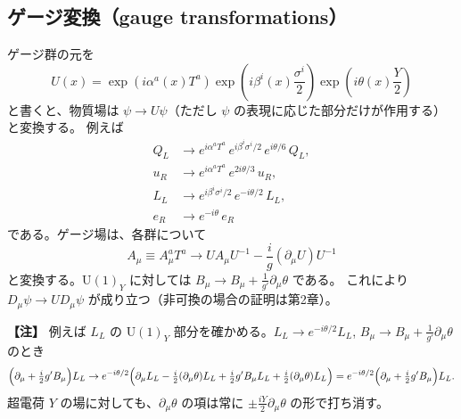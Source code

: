 \documentclass[uplatex,dvipdfmx,a4paper,11pt,openany]{jsbook}
\newenvironment{note}{\vspace{1ex}\par\footnotesize\noindent\textbf{【注】}}{\par\vspace{1ex}}
\numberwithin{equation}{chapter}
\theoremstyle{definition}
\theoremstyle{plain}
\theoremstyle{remark}
\newcommand{\U}{\mathrm{U}}
\begin{document}
\subsection{ゲージ変換（gauge transformations）}
ゲージ群の元を
\begin{equation}
U(x)=
\exp\left(i\alpha^a(x)T^a\right)
\exp\left(i\beta^i(x)\frac{\sigma^i}{2}\right)
\exp\left(i\theta(x)\frac{Y}{2}\right)
\end{equation}
と書くと、物質場は $\psi\to U\psi$（ただし $\psi$ の表現に応じた部分だけが作用する）と変換する。
例えば
\begin{align}
Q_L&\to
e^{i\alpha^aT^a}\,e^{i\beta^i\sigma^i/2}\,e^{i\theta/6}\,Q_L,\\
u_R&\to e^{i\alpha^aT^a}\,e^{2i\theta/3}\,u_R,\\
L_L&\to e^{i\beta^i\sigma^i/2}\,e^{-i\theta/2}\,L_L,\\
e_R&\to e^{-i\theta}\,e_R
\end{align}
である。ゲージ場は、各群について
\begin{equation}
A_\mu\equiv A_\mu^aT^a\to
UA_\mu U^{-1}-\frac ig(\partial_\mu U)U^{-1}
\end{equation}
と変換する。$\U(1)_Y$ に対しては
$B_\mu\to B_\mu+\frac{1}{g'}\partial_\mu\theta$ である。
これにより $D_\mu\psi\to UD_\mu\psi$ が成り立つ（非可換の場合の証明は第2章）。
\begin{note}
例えば $L_L$ の $\U(1)_Y$ 部分を確かめる。$L_L\to e^{-i\theta/2}L_L$,
$B_\mu\to B_\mu+\frac{1}{g'}\partial_\mu\theta$ のとき
\[
\Bigl(\partial_\mu+\tfrac i2g'B_\mu\Bigr)L_L
\to
e^{-i\theta/2}\Bigl(
\partial_\mu L_L-\tfrac i2(\partial_\mu\theta)L_L
+\tfrac i2g'B_\mu L_L+\tfrac i2(\partial_\mu\theta)L_L
\Bigr)
=e^{-i\theta/2}\Bigl(\partial_\mu+\tfrac i2g'B_\mu\Bigr)L_L .
\]
超電荷 $Y$ の場に対しても、$\partial_\mu\theta$ の項は常に $\pm\frac{iY}{2}\partial_\mu\theta$ の形で打ち消す。
\end{note}
\end{document}
